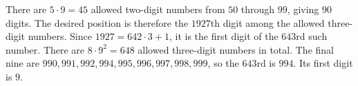 There are $5\cdot9=45$ allowed two-digit numbers from $50$ through $99$, giving $90$ digits. The desired position is therefore the $1927$th digit among the allowed three-digit numbers. Since $1927=642\cdot3+1$, it is the first digit of the $643$rd such number. There are $8\cdot9^2=648$ allowed three-digit numbers in total. The final nine are $990,991,992,994,995,996,997,998,999$, so the $643$rd is $994$. Its first digit is $\boxed9$.
